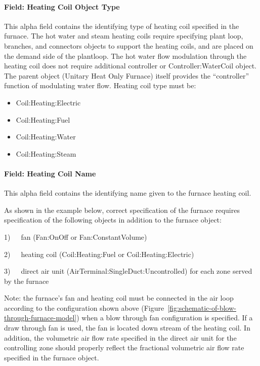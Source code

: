 \paragraph{Field: Heating Coil Object Type}\label{field-heating-coil-object-type-5}

This alpha field contains the identifying type of heating coil specified in the furnace. The hot water and steam heating coils require specifying plant loop, branches, and connectors objects to support the heating coils, and are placed on the demand side of the plantloop. The hot water flow modulation through the heating coil does not require additional controller or Controller:WaterCoil object. The parent object (Unitary Heat Only Furnace) itself provides the ``controller'' function of modulating water flow. Heating coil type must be:

\begin{itemize}
\item
  Coil:Heating:Electric
\item
  Coil:Heating:Fuel
\item
  Coil:Heating:Water
\item
  Coil:Heating:Steam
\end{itemize}

\paragraph{Field: Heating Coil Name}\label{field-heating-coil-name-5}

This alpha field contains the identifying name given to the furnace heating coil.

As shown in the example below, correct specification of the furnace requires specification of the following objects in addition to the furnace object:

1)~~~fan (Fan:OnOff or Fan:ConstantVolume)

2)~~~heating coil (Coil:Heating:Fuel or Coil:Heating:Electric)

3)~~~direct air unit (AirTerminal:SingleDuct:Uncontrolled) for each zone served by the furnace

Note: the furnace's fan and heating coil must be connected in the air loop according to the configuration shown above (Figure~\ref{fig:schematic-of-blow-through-furnace-model}) when a blow through fan configuration is specified. If a draw through fan is used, the fan is located down stream of the heating coil. In addition, the volumetric air flow rate specified in the direct air unit for the controlling zone should properly reflect the fractional volumetric air flow rate specified in the furnace object.

